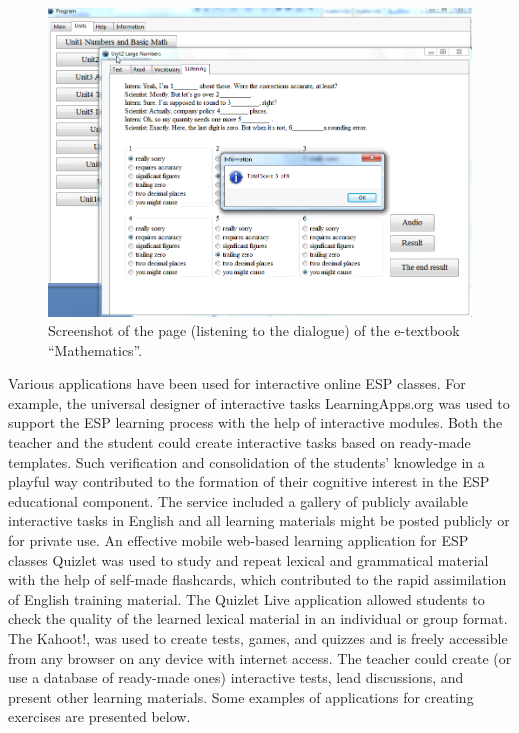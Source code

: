\begin{figure}[htpb]
\centering
\begin{minipage}{.65\textwidth}
\caption{Screenshot of the page (listening to the dialogue) of the e-textbook \enquote{Mathematics}.}	
\label{fig-02}
\includegraphics[width=\textwidth]{figure02}
\end{minipage}
\end{figure}

Various applications have been used for interactive online ESP classes.
For example, the universal designer of interactive tasks
LearningApps.org was used to support the ESP learning process with the
help of interactive modules. Both the teacher and the student could
create interactive tasks based on ready-made templates. Such
verification and consolidation of the students' knowledge in a playful
way contributed to the formation of their cognitive interest in the ESP
educational component. The service included a gallery of publicly
available interactive tasks in English and all learning materials might
be posted publicly or for private use. An effective mobile web-based
learning application for ESP classes Quizlet was used to study and
repeat lexical and grammatical material with the help of self-made
flashcards, which contributed to the rapid assimilation of English
training material. The Quizlet Live application allowed students to
check the quality of the learned lexical material in an individual or
group format. The Kahoot!, was used to create tests, games, and quizzes
and is freely accessible from any browser on any device with internet
access. The teacher could create (or use a database of ready-made ones)
interactive tests, lead discussions, and present other learning
materials. Some examples of applications for creating exercises are
presented below.

